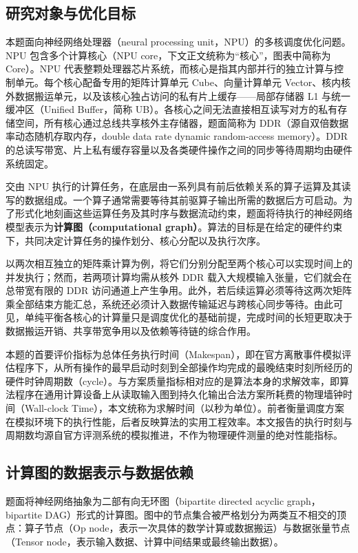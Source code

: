 \documentclass[anonymous,notoc]{gmcm2026}
\begin{document}
\subsection{研究对象与优化目标}

本题面向神经网络处理器（neural processing unit，NPU）的多核调度优化问题。NPU 包含多个计算核心（NPU core，下文正文统称为``核心''，图表中简称为 Core）。NPU 代表整颗处理器芯片系统，而核心是指其内部并行的独立计算与控制单元。每个核心配备专用的矩阵计算单元 Cube、向量计算单元 Vector、核内核外数据搬运单元，以及该核心独占访问的私有片上缓存------局部存储器 L1 与统一缓冲区（Unified Buffer，简称 UB）。各核心之间无法直接相互读写对方的私有存储空间，所有核心通过总线共享核外主存储器，题面简称为 DDR（源自双倍数据率动态随机存取内存，double data rate dynamic random-access memory）。DDR 的总读写带宽、片上私有缓存容量以及各类硬件操作之间的同步等待周期均由硬件系统固定。

交由 NPU 执行的计算任务，在底层由一系列具有前后依赖关系的算子运算及其读写的数据组成。一个算子通常需要等待其前驱算子输出所需的数据后方可启动。为了形式化地刻画这些运算任务及其时序与数据流动约束，题面将待执行的神经网络模型表示为\textbf{计算图（computational graph）}。算法的目标是在给定的硬件约束下，共同决定计算任务的操作划分、核心分配以及执行次序\cite{ref1}。

以两次相互独立的矩阵乘计算为例，将它们分别分配至两个核心可以实现时间上的并发执行；然而，若两项计算均需从核外 DDR 载入大规模输入张量，它们就会在总带宽有限的 DDR 访问通道上产生争用。此外，若后续运算必须等待这两次矩阵乘全部结束方能汇总，系统还必须计入数据传输延迟与跨核心同步等待。由此可见，单纯平衡各核心的计算量只是调度优化的基础前提，完成时间的长短更取决于数据搬运开销、共享带宽争用以及依赖等待链的综合作用。

本题的首要评价指标为总体任务执行时间（Makespan），即在官方离散事件模拟评估程序下，从所有操作的最早启动时刻到全部操作均完成的最晚结束时刻所经历的硬件时钟周期数（cycle）。与方案质量指标相对应的是算法本身的求解效率，即算法程序在通用计算设备上从读取输入图到持久化输出合法方案所耗费的物理墙钟时间（Wall-clock Time），本文统称为求解时间（以秒为单位）。前者衡量调度方案在模拟环境下的执行性能，后者反映算法的实用工程效率。本文报告的执行时刻与周期数均源自官方评测系统的模拟推进，不作为物理硬件测量的绝对性能指标。

\subsection{计算图的数据表示与数据依赖}

题面将神经网络抽象为二部有向无环图（bipartite directed acyclic graph，bipartite DAG）形式的计算图。图中的节点集合被严格划分为两类互不相交的顶点：算子节点（Op node，表示一次具体的数学计算或数据搬运）与数据张量节点（Tensor node，表示输入数据、计算中间结果或最终输出数据）。
\end{document}
